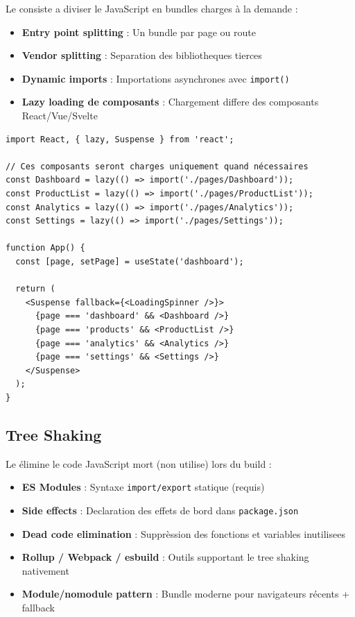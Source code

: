 Le  consiste a diviser le JavaScript en bundles charges à la demande :

\begin{itemize}
    \item \textbf{Entry point splitting} : Un bundle par page ou route
    \item \textbf{Vendor splitting} : Separation des bibliotheques tierces
    \item \textbf{Dynamic imports} : Importations asynchrones avec \texttt{import()}
    \item \textbf{Lazy loading de composants} : Chargement differe des composants React/Vue/Svelte
\end{itemize}

\begin{lstlisting}[style=code,caption={Code Splitting avec React.lazy et Suspense}]
import React, { lazy, Suspense } from 'react';

// Ces composants seront charges uniquement quand nécessaires
const Dashboard = lazy(() => import('./pages/Dashboard'));
const ProductList = lazy(() => import('./pages/ProductList'));
const Analytics = lazy(() => import('./pages/Analytics'));
const Settings = lazy(() => import('./pages/Settings'));

function App() {
  const [page, setPage] = useState('dashboard');

  return (
    <Suspense fallback={<LoadingSpinner />}>
      {page === 'dashboard' && <Dashboard />}
      {page === 'products' && <ProductList />}
      {page === 'analytics' && <Analytics />}
      {page === 'settings' && <Settings />}
    </Suspense>
  );
}
\end{lstlisting}

\subsection{Tree Shaking}

Le  élimine le code JavaScript mort (non utilise) lors du build :

\begin{itemize}
    \item \textbf{ES Modules} : Syntaxe \texttt{import/export} statique (requis)
    \item \textbf{Side effects} : Declaration des effets de bord dans \texttt{package.json}
    \item \textbf{Dead code elimination} : Supprèssion des fonctions et variables inutilisees
    \item \textbf{Rollup / Webpack / esbuild} : Outils supportant le tree shaking nativement
    \item \textbf{Module/nomodule pattern} : Bundle moderne pour navigateurs récents + fallback
\end{itemize}

